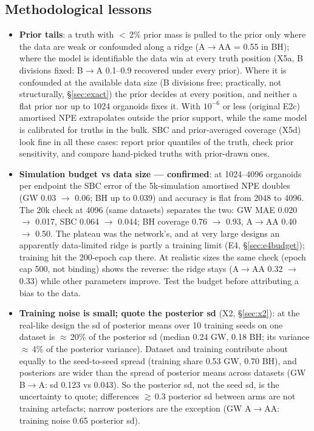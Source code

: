 \documentclass[10pt,a4paper]{article}
\begin{document}
\subsection*{Methodological lessons}
\begin{itemize}
\item \textbf{Prior tails}: a truth with $<$\,2\% prior mass is pulled to the prior only where the data are weak or confounded along a ridge (A$\to$AA = 0.55 in BH); where the model is identifiable the data win at every truth position (X5a, B divisions fixed: B$\to$A 0.1--0.9 recovered under every prior). Where it is confounded at the available data size (B divisions free; practically, not structurally, \S\ref{sec:exact}) the prior decides at every position, and neither a flat prior nor up to 1024 organoids fixes it. With $10^{-6}$ or less (original E2c) amortised NPE extrapolates outside the prior support, while the same model is calibrated for truths in the bulk. SBC and prior-averaged coverage (X5d) look fine in all these cases: report prior quantiles of the truth, check prior sensitivity, and compare hand-picked truths with prior-drawn ones.
\item \textbf{Simulation budget vs data size --- confirmed}: at 1024--4096 organoids per endpoint the SBC error of the 5k-simulation amortised NPE doubles (GW 0.03 $\to$ 0.06; BH up to 0.039) and accuracy is flat from 2048 to 4096. The 20k check at 4096 (same datasets) separates the two: GW MAE 0.020 $\to$ 0.017, SBC 0.064 $\to$ 0.044; BH coverage 0.76 $\to$ 0.93, A$\to$AA 0.40 $\to$ 0.50. The plateau was the network's, and at very large designs an apparently data-limited ridge is partly a training limit (E4, \S\ref{sec:e4budget}); training hit the 200-epoch cap there. At realistic sizes the same check (epoch cap 500, not binding) shows the reverse: the ridge stays (A$\to$AA 0.32 $\to$ 0.33) while other parameters improve. Test the budget before attributing a bias to the data.
\item \textbf{Training noise is small; quote the posterior sd} (X2, \S\ref{sec:x2}): at the real-like design the sd of posterior means over 10 training seeds on one dataset is $\approx$\,20\% of the posterior sd (median 0.24 GW, 0.18 BH; its variance $\approx$\,4\% of the posterior variance). Dataset and training contribute about equally to the seed-to-seed spread (training share 0.53 GW, 0.70 BH), and posteriors are wider than the spread of posterior means across datasets (GW B$\to$A: sd 0.123 vs 0.043). So the posterior sd, not the seed sd, is the uncertainty to quote; differences $\gtrsim$\,0.3 posterior sd between arms are not training artefacts; narrow posteriors are the exception (GW A$\to$AA: training noise 0.65 posterior sd).

\end{itemize}
\end{document}
